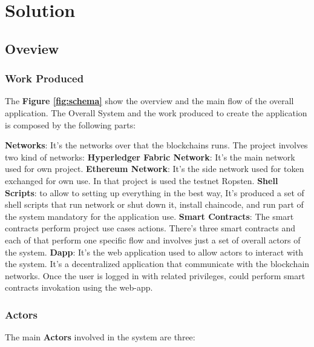 \chapter{Solution}


\section{Oveview} 


\subsection{Work Produced}

The \textbf{Figure \ref{fig:schema}} show the overview and the main flow of the overall application.
The Overall System and the work produced to create the application is composed by the following parts:
\begin{outline}
    \1 \textbf{Networks}: It's the networks over that the blockchains runs. The project involves two kind of networks:
    \2 \textbf{Hyperledger Fabric Network}: It's the main network used for own project.
    \2 \textbf{Ethereum Network}: It's the side network used for token exchanged for own use. In that 
    project is used the testnet Ropsten.    
    \1 \textbf{Shell Scripts}: to allow to setting up everything in the best way, It's produced a set of 
    shell scripts that run network or shut down it, install chaincode, and run part of the system mandatory 
    for the application use. 
    \1 \textbf{Smart Contracts}: The smart contracts perform project use cases actions. 
    There's three smart contracts and each of that perform one specific flow and involves just
    a set of overall actors of the system.  
    \1 \textbf{Dapp}: It's the web application used to allow actors to interact with the system. It's a
    decentralized application that communicate with the blockchain networks. Once the user is logged in with 
    related privileges, could perform smart contracts invokation using the web-app.
\end{outline}

\subsection{Actors}

The main \textbf{Actors} involved in the system are three:

